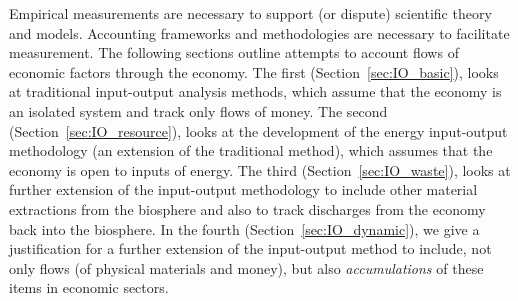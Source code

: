Empirical measurements are necessary to support
(or dispute) scientific theory and models.
Accounting frameworks and methodologies are necessary
to facilitate measurement.
The following sections outline attempts to
account flows of economic factors through the
economy. 
The first (Section~\ref{sec:IO_basic}),
looks at traditional input-output analysis methods, 
which assume that the economy is an isolated system 
and track only flows of money.
The second (Section~\ref{sec:IO_resource}),
looks at the development of the energy input-output methodology
(an extension of the traditional method),
which assumes that the economy is open to inputs of energy.
The third (Section~\ref{sec:IO_waste}),
looks at further extension of the input-output methodology
to include other material extractions from the biosphere and also
to track discharges from the economy back into the biosphere.
In the fourth (Section~\ref{sec:IO_dynamic}),
we give a justification for a further extension of the input-output
method to include,
not only flows (of physical materials and money),
but also \emph{accumulations} of these items
in economic sectors.
%
%
%
%
%
%



